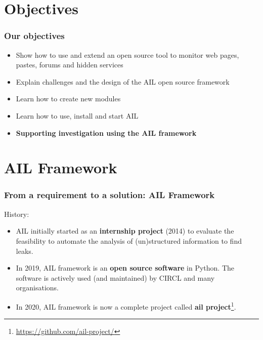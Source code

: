 \documentclass{beamer}
\begin{document}
\section{Objectives}
\begin{frame}
\frametitle{Our objectives}
    \begin{itemize}
        \item Show how to use and extend an open source tool to monitor web pages, pastes, forums and hidden services
        \item Explain challenges and the design of the AIL open source framework
        \item Learn how to create new modules
        \item Learn how to use, install and start AIL
        \item {\bf Supporting investigation using the AIL framework}
    \end{itemize}
\end{frame}

\section{AIL Framework}
\begin{frame}
    \frametitle{From a requirement to a solution: AIL Framework}
    \large{History:}
    \begin{itemize}
        \item AIL initially started as an \textbf{internship project} (2014) to evaluate the feasibility to automate the analysis of (un)structured information to find leaks.
        \item In 2019, AIL framework is an \textbf{open source software} in Python. The software is actively used (and maintained) by CIRCL and many organisations.
        \item In 2020, AIL framework is now a complete project called \textbf{ail project}\footnote{\url{https://github.com/ail-project/}}.
    \end{itemize}
\end{frame}
\end{document}
